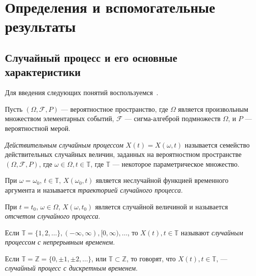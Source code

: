 
\newpage
\chapter{Определения и вспомогательные результаты}
\label{c:definitions}

\section{Случайный процесс и его основные характеристики}

Для введения следующих понятий воспользуемся~\cite{brillinjer-ts, trush-ts}.

Пусть $ (\Omega, \mathcal{F}, P) $ --- вероятностное пространство, где $\Omega$ является произвольным множеством элементарных событий, $\mathcal{F}$ --- сигма-алгеброй подмножеств $\Omega$, и $P$ --- вероятностной мерой.

\begin{Definition}
\label{def:stochastic-process}
	\textit{Действительным случайным процессом} $ X(t) = X(\omega, t) $ называется семейство действительных случайных величин, заданных на вероятностном пространстве $ (\Omega, \mathcal{F}, P) $, где $ \omega \in \Omega, t \in \mathbb{T}$, где $ \mathbb{T} $ --- некоторое параметрическое множество.

	При $ \omega = \omega_{0} $, $ t \in \mathbb{T} $, $ X(\omega_{0}, t) $ является неслучайной функцией временного аргумента и называется \textit{траекторией случайного процесса}.

	При $ t = t_{0} $, $ \omega \in \Omega $, $ X(\omega, t_{0}) $ является случайной величиной и называется \textit{отсчетом случайного процесса}.
\end{Definition}

\begin{Definition}%
    Если $ \mathbb{T} = \{ 1, 2, \dots \}, (-\infty, \infty), [0, \infty), \dots $, то $ X(t), t \in \mathbb{T} $ называют \textit{случайным процессом с непрерывным временем}.
\end{Definition}

\begin{Definition}
	Если $ \mathbb{T} = \mathbb{Z} = \{ 0, \pm 1, \pm 2, \dots \} $, или $ \mathbb{T} \subset \mathbb{Z} $, то говорят, что $ X(t), t \in \mathbb{T} $, --- \textit{случайный процесс с дискретным временем}.
\end{Definition}

